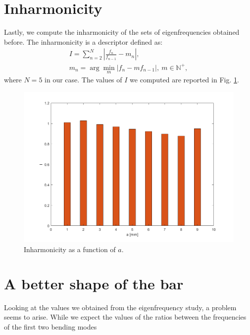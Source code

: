 \documentclass[a4paper]{article}
\begin{document}
\section{Inharmonicity}

Lastly, we compute the inharmonicity of the sets of eigenfrequencies obtained before. The inharmonicity is a descriptor defined as:
\begin{gather*}
	I = \sum_{n=2}^{N} \left| \frac{f_n}{f_{n-1}} - m_n \right|, \\
	m_n = \arg \underset{m}{\min} \left| f_n - m f_{n-1} \right|,~ m \in \mathbb{N}^+,
\end{gather*}
where $N=5$ in our case. The values of $I$ we computed are reported in Fig. \ref{fig:inharm}.

\begin{figure}[h]
	\centering
	\includegraphics[width=0.85\linewidth]{inharmonicity.png}
	\caption{Inharmonicity as a function of $a$.}
	\label{fig:inharm}
\end{figure}

\section{A better shape of the bar}

Looking at the values we obtained from the eigenfrequency study, a problem seems to arise. While we expect the values of the ratios between the frequencies of the first two bending modes
\end{document}

